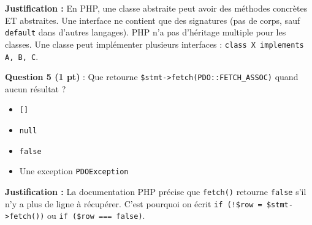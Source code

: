 \documentclass[11pt,a4paper]{article}
\newcommand{\cbv}{\textcolor{correctgreen}{$\boxtimes$}\ }  %
\newcommand{\cbx}{\textcolor{wrongred}{$\square$}\ }         %
\begin{document}
\begin{tcolorbox}[notebox]
\textbf{Justification :} En PHP, une classe abstraite peut avoir des méthodes concrètes ET abstraites. Une interface ne contient que des signatures (pas de corps, sauf \texttt{default} dans d'autres langages). PHP n'a pas d'héritage multiple pour les classes. Une classe peut implémenter plusieurs interfaces : \texttt{class X implements A, B, C}.
\end{tcolorbox}

\vspace{8pt}

\noindent\textbf{Question 5 (1 pt)} : Que retourne \texttt{\$stmt->fetch(PDO::FETCH\_ASSOC)} quand aucun résultat ?

\begin{itemize}[leftmargin=2em, itemsep=4pt, topsep=4pt]
  \item[\cbx] \texttt{[]}
  \item[\cbx] \texttt{null}
  \item[\cbv] \texttt{false}
  \item[\cbx] Une exception \texttt{PDOException}
\end{itemize}

\begin{tcolorbox}[notebox]
\textbf{Justification :} La documentation PHP précise que \texttt{fetch()} retourne \texttt{false} s'il n'y a plus de ligne à récupérer. C'est pourquoi on écrit \texttt{if (!\$row = \$stmt->fetch())} ou \texttt{if (\$row === false)}.
\end{tcolorbox}

\vspace{12pt}
\end{document}
